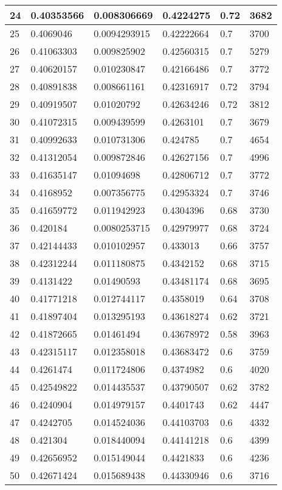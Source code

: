 \begin{longtable}{|l|l|l|l|l|l|}
24 & 0.40353566 & 0.008306669 & 0.4224275 & 0.72 & 3682 \\ \hline 
25 & 0.4069046 & 0.0094293915 & 0.42222664 & 0.7 & 3700 \\ \hline 
26 & 0.41063303 & 0.009825902 & 0.42560315 & 0.7 & 5279 \\ \hline 
27 & 0.40620157 & 0.010230847 & 0.42166486 & 0.7 & 3772 \\ \hline 
28 & 0.40891838 & 0.008661161 & 0.42316917 & 0.72 & 3794 \\ \hline 
29 & 0.40919507 & 0.01020792 & 0.42634246 & 0.72 & 3812 \\ \hline 
30 & 0.41072315 & 0.009439599 & 0.4263101 & 0.7 & 3679 \\ \hline 
31 & 0.40992633 & 0.010731306 & 0.424785 & 0.7 & 4654 \\ \hline 
32 & 0.41312054 & 0.009872846 & 0.42627156 & 0.7 & 4996 \\ \hline 
33 & 0.41635147 & 0.01094698 & 0.42806712 & 0.7 & 3772 \\ \hline 
34 & 0.4168952 & 0.007356775 & 0.42953324 & 0.7 & 3746 \\ \hline 
35 & 0.41659772 & 0.011942923 & 0.4304396 & 0.68 & 3730 \\ \hline 
36 & 0.420184 & 0.0080253715 & 0.42979977 & 0.68 & 3724 \\ \hline 
37 & 0.42144433 & 0.010102957 & 0.433013 & 0.66 & 3757 \\ \hline 
38 & 0.42312244 & 0.011180875 & 0.4342152 & 0.68 & 3715 \\ \hline 
39 & 0.4131422 & 0.01490593 & 0.43481174 & 0.68 & 3695 \\ \hline 
40 & 0.41771218 & 0.012744117 & 0.4358019 & 0.64 & 3708 \\ \hline 
41 & 0.41897404 & 0.013295193 & 0.43618274 & 0.62 & 3721 \\ \hline 
42 & 0.41872665 & 0.01461494 & 0.43678972 & 0.58 & 3963 \\ \hline 
43 & 0.42315117 & 0.012358018 & 0.43683472 & 0.6 & 3759 \\ \hline 
44 & 0.4261474 & 0.011724806 & 0.4374982 & 0.6 & 4020 \\ \hline 
45 & 0.42549822 & 0.014435537 & 0.43790507 & 0.62 & 3782 \\ \hline 
46 & 0.4240904 & 0.014979157 & 0.4401743 & 0.62 & 4447 \\ \hline 
47 & 0.4242705 & 0.014524036 & 0.44103703 & 0.6 & 4332 \\ \hline 
48 & 0.421304 & 0.018440094 & 0.44141218 & 0.6 & 4399 \\ \hline 
49 & 0.42656952 & 0.015149044 & 0.4421833 & 0.6 & 4236 \\ \hline 
50 & 0.42671424 & 0.015689438 & 0.44330946 & 0.6 & 3716 \\ \hline 
\end{longtable}